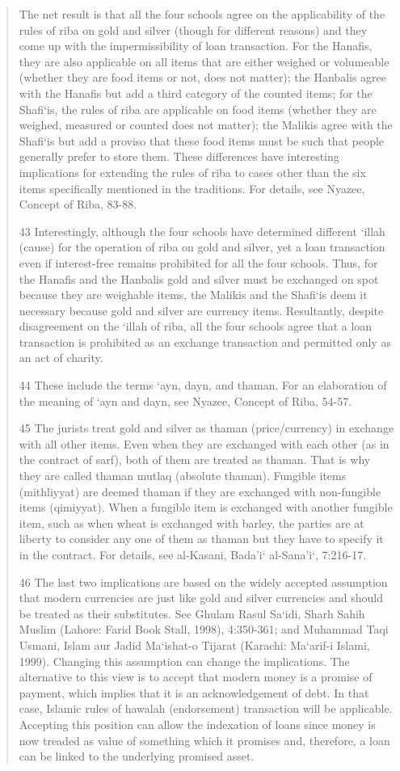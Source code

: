 \begin{quote}
The net result is that all the four schools agree on the applicability of the rules of riba on gold and silver (though for different reasons) and they come up with the impermissibility of loan transaction. For the Hanafis, they are also applicable on all items that are either weighed or volumeable (whether they are food items or not, does not matter); the Hanbalis agree with the Hanafis but add a third category of the counted items; for the Shafi‘is, the rules of riba are applicable on food items (whether they are weighed, measured or counted does not matter); the Malikis agree with the Shafi‘is but add a proviso that these food items must be such that people generally prefer to store them. These differences have interesting implications for extending the rules of riba to cases other than the six items specifically mentioned in the traditions. For details, see Nyazee, Concept of Riba, 83-88.

43 Interestingly, although the four schools have determined different ‘illah (cause) for the operation of riba on gold and silver, yet a loan transaction even if interest-free remains prohibited for all the four schools. Thus, for the Hanafis and the Hanbalis gold and silver must be exchanged on spot because they are weighable items, the Malikis and the Shafi‘is deem it necessary because gold and silver are currency items. Resultantly, despite disagreement on the ‘illah of riba, all the four schools agree that a loan transaction is prohibited as an exchange transaction and permitted only as an act of charity.

44 These include the terms ‘ayn, dayn, and thaman. For an elaboration of the meaning of ‘ayn and dayn, see Nyazee, Concept of Riba, 54-57.

45 The jurists treat gold and silver as thaman (price/currency) in exchange with all other items. Even when they are exchanged with each other (as in the contract of sarf), both of them are treated as thaman. That is why they are called thaman mutlaq (absolute thaman). Fungible items (mithliyyat) are deemed thaman if they are exchanged with non-fungible items (qimiyyat). When a fungible item is exchanged with another fungible item, such as when wheat is exchanged with barley, the parties are at liberty to consider any one of them as thaman but they have to specify it in the contract. For details, see al-Kasani, Bada'i‘ al-Sana'i‘, 7:216-17.

46 The last two implications are based on the widely accepted assumption that modern currencies are just like gold and silver currencies and should be treated as their substitutes. See Ghulam Rasul Sa‘idi, Sharh Sahih Muslim (Lahore: Farid Book Stall, 1998), 4:350-361; and Muhammad Taqi Usmani, Islam aur Jadid Ma‘ishat-o Tijarat (Karachi: Ma‘arif-i Islami, 1999). Changing this assumption can change the implications. The alternative to this view is to accept that modern money is a promise of payment, which implies that it is an acknowledgement of debt. In that case, Islamic rules of hawalah (endorsement) transaction will be applicable. Accepting this position can allow the indexation of loans since money is now treaded as value of something which it promises and, therefore, a loan can be linked to the underlying promised asset.


\end{quote}
